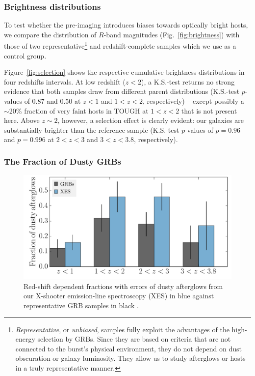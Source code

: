 \documentclass[traditabstract, longauth]{aa}
\begin{document}
\subsubsection{Brightness distributions}
\label{sec:bdist}

 {To test whether the pre-imaging introduces biases towards optically bright hosts, we compare the distribution of $R$-band magnitudes (Fig.~\ref{fig:brightness}) with those of two representative\footnote{\textit{Representative}, or \textit{unbiased}, samples fully exploit the advantages of the high-energy selection by GRBs. Since they are based on criteria that are not connected to the burst's physical environment, they do not depend on dust obscuration or galaxy luminosity. They allow us to study afterglows or hosts in a truly representative manner.} and redshift-complete samples \citep{2012ApJ...756..187H, 2014arXiv1409.7064V} which we use as a control group.}
 
 {Figure~\ref{fig:selection} shows the respective cumulative brightness distributions in four redshifts intervals. At low redshift ($z<2$), a K.S.-test returns no strong evidence that both samples draw from different parent distributions (K.S.-test $p$-values of 0.87 and 0.50 at $z<1$ and $1<z<2$, respectively) -- except possibly a $\sim$20\% fraction of very faint hosts in TOUGH at $1<z<2$ that is not present here. Above $z \sim 2$, however, a selection effect is clearly evident: our galaxies are substantially brighter than the reference sample (K.S.-test $p$-values of $p=0.96$ and $p=0.996$ at $2<z<3$ and $3<z<3.8$, respectively).}

\subsubsection{The Fraction of Dusty GRBs}
\label{sec:dusty}

\begin{figure}
\includegraphics[angle=0, width=0.99\columnwidth]{Figs/DustyFrac.pdf}
\caption{Red-shift dependent fractions with errors of dusty afterglows from our X-shooter emission-line spectroscopy (XES) in blue against representative GRB samples in black \citep{2011A&A...526A..30G, 2013MNRAS.432.1231C}.}
\label{fig:dustyfrac}
\end{figure}
\end{document}
